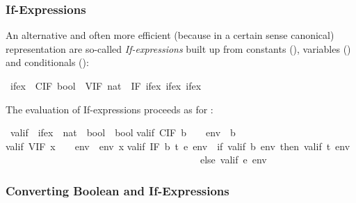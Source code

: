 \begin{isabellebody}
\begin{isamarkuptext}
\subsubsection{If-Expressions}

An alternative and often more efficient (because in a certain sense
canonical) representation are so-called \emph{If-expressions} built up
from constants (), variables () and conditionals
():%
\end{isamarkuptext}%
\isamarkuptrue%
\ ifex\ {\isacharequal}\ CIF\ bool\ {\isacharbar}\ VIF\ nat\ {\isacharbar}\ IF\ ifex\ ifex\ ifex\isamarkupfalse%
%
\begin{isamarkuptext}%
\noindent
The evaluation of If-expressions proceeds as for :%
\end{isamarkuptext}%
\isamarkuptrue%
\ valif\ {\isacharcolon}{\isacharcolon}\ {\isachardoublequote}ifex\ {\isasymRightarrow}\ {\isacharparenleft}nat\ {\isasymRightarrow}\ bool{\isacharparenright}\ {\isasymRightarrow}\ bool{\isachardoublequote}\isanewline
\isamarkupfalse%
\isanewline
{\isachardoublequote}valif\ {\isacharparenleft}CIF\ b{\isacharparenright}\ \ \ \ env\ {\isacharequal}\ b{\isachardoublequote}\isanewline
{\isachardoublequote}valif\ {\isacharparenleft}VIF\ x{\isacharparenright}\ \ \ \ env\ {\isacharequal}\ env\ x{\isachardoublequote}\isanewline
{\isachardoublequote}valif\ {\isacharparenleft}IF\ b\ t\ e{\isacharparenright}\ env\ {\isacharequal}\ {\isacharparenleft}if\ valif\ b\ env\ then\ valif\ t\ env\isanewline
\ \ \ \ \ \ \ \ \ \ \ \ \ \ \ \ \ \ \ \ \ \ \ \ \ \ \ \ \ \ \ \ \ \ \ \ \ \ \ \ else\ valif\ e\ env{\isacharparenright}{\isachardoublequote}\isamarkupfalse%
%
\begin{isamarkuptext}%
\subsubsection{Converting Boolean and If-Expressions}


\end{isamarkuptext}
\end{isabellebody}
